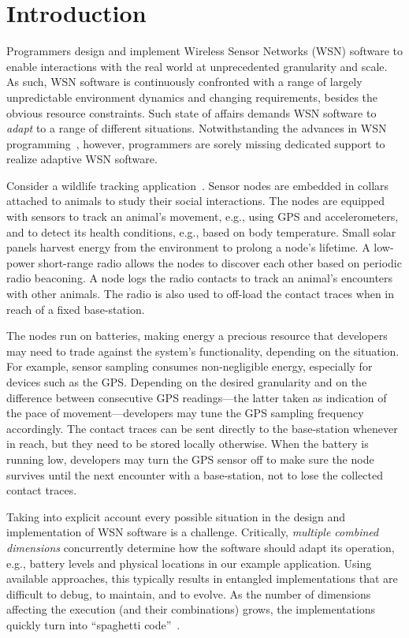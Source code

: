 \section{Introduction} 

Programmers design and implement Wireless Sensor Networks (WSN)
software to enable interactions with the real world at unprecedented
granularity and scale. As such, WSN software is continuously confronted
with a range of largely unpredictable environment dynamics and
changing requirements, besides the obvious resource constraints. Such
state of affairs demands WSN software to \emph{adapt} to a range of
different situations. Notwithstanding the advances in WSN
programming~\cite{mottola10:survey}, however, programmers are sorely
missing dedicated support to realize adaptive WSN
software.

 Consider a wildlife tracking
application~\cite{pasztor10:selective}. Sensor nodes are embedded in
collars attached to animals to study their social interactions. The
nodes are equipped with sensors to track an animal's movement, e.g.,
using GPS and accelerometers, and to detect its health conditions,
e.g., based on body temperature. Small solar panels harvest energy
from the environment to prolong a node's lifetime. A low-power
short-range radio allows the nodes to discover each other based on
periodic radio beaconing.  A node logs the radio contacts to track an
animal's encounters with other animals. The radio is also used to
off-load the contact traces when in reach of a fixed base-station.

The nodes run on batteries, making energy a precious resource that
developers may need to trade against the system's functionality,
depending on the situation. For example, sensor sampling consumes
non-negligible energy, especially for devices such as the
GPS. Depending on the desired granularity and on the difference
between consecutive GPS readings---the latter taken as indication of
the pace of movement---developers may tune the GPS sampling frequency
accordingly. The contact traces can be sent directly to the
base-station whenever in reach, but they need to be stored locally
otherwise.  When the battery is running low, developers may turn the
GPS sensor off to make sure the node survives until the next encounter with
a base-station, not to lose the collected contact traces.

 Taking into explicit account every possible
situation in the design and implementation of WSN software is a
challenge. Critically, \emph{multiple combined dimensions}
concurrently determine how the software should adapt its operation,
e.g., battery levels and physical locations in our example
application. Using available approaches, this typically results in
entangled implementations that are difficult to debug, to maintain,
and to evolve.  As the number of dimensions affecting the execution
(and their combinations) grows, the implementations quickly turn into
``spaghetti code''~\cite{finne10improving}.

